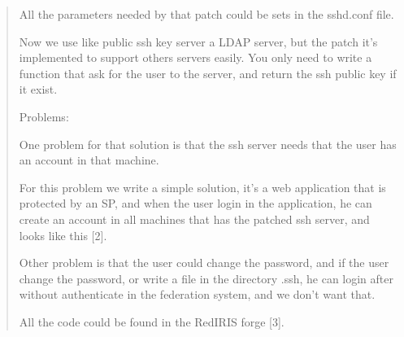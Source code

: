 \begin{quote}
    All the parameters needed by that patch could be sets in the
    sshd.conf file.

    Now we use like public ssh key server a LDAP server, but the patch
    it's implemented to support others servers easily. You only need
    to write a function that ask for the user to the server, and
    return the ssh public key if it exist.

Problems:
    
    One problem for that solution is that the ssh server needs that
    the user has an account in that machine.

    For this problem we write a simple solution, it's a web
    application that is protected by an SP, and when the user login in
    the application, he can create an account in all machines that
    has the patched ssh server, and looks like this [2].

    Other problem is that the user could change the password, and if
    the user change the password, or write a file in the directory
    .ssh, he can login after without authenticate in the federation
    system, and we don't want that.

All the code could be found in the RedIRIS forge [3].


\end{quote}
